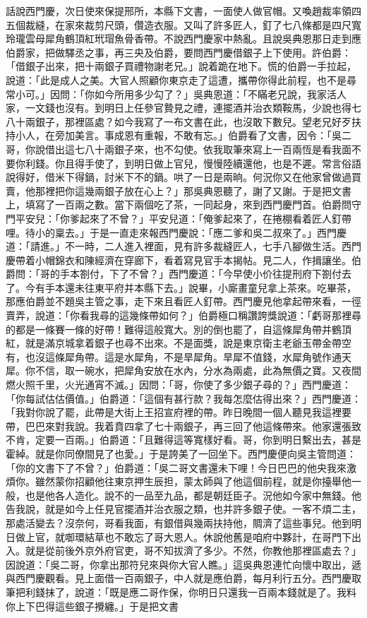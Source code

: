 \begin{showcontents}{}
話說西門慶，次日使來保提邢所，本縣下文書，一面使人做官帽。又喚趙裁率領四五個裁縫，在家來裁剪尺頭，儹造衣服。又叫了許多匠人，釘了七八條都是四尺寬玲瓏雲母犀角鶴頂紅玳瑁魚骨香帶。不說西門慶家中熱亂。且說吳典恩那日走到應伯爵家，把做驛丞之事，再三央及伯爵，要問西門慶借銀子上下使用。許伯爵：「借銀子出來，把十兩銀子買禮物謝老兄。」說着跪在地下。慌的伯爵一手拉起，說道：「此是成人之美。大官人照顧你東京走了這遭，攜帶你得此前程，也不是尋常小可。」因問：「你如今所用多少勾了？」吳典恩道：「不瞞老兄說，我家活人家，一文錢也沒有。到明日上任參官贄見之禮，連擺酒并治衣類鞍馬，少說也得七八十兩銀子，那裡區處？如今我寫了一布文書在此，也沒敢下數兒。望老兄好歹扶持小人，在旁加美言。事成恩有重報，不敢有忘。」伯爵看了文書，因令：「吳二哥，你說借出這七八十兩銀子來，也不勾使。依我取筆來寫上一百兩恆是看我面不要你利錢。你且得手使了，到明日做上官兒，慢慢陸續還他，也是不遲。常言俗語說得好，借米下得鍋，討米下不的鍋。哄了一日是兩晌。何況你又在他家曾做過買賣，他那裡把你這幾兩銀子放在心上？」那吳典恩聽了，謝了又謝。于是把文書上，填寫了一百兩之數。當下兩個吃了茶，一同起身，來到西門慶門首。伯爵問守門平安兒：「你爹起來了不曾？」平安兒道：「俺爹起來了，在捲棚看着匠人釘帶哩。待小的稟去。」于是一直走來報西門慶說：「應二爹和吳二叔來了。」西門慶道：「請進。」不一時，二人進入裡面，見有許多裁縫匠人，七手八腳做生活。西門慶帶着小帽錦衣和陳經濟在穿廊下，看着寫見官手本揭帖。見二人，作揖讓坐。伯爵問：「哥的手本劄付，下了不曾？」西門慶道：「今早使小价往提刑府下劄付去了。今有手本還未往東平府并本縣下去。」說畢，小廝畫童兒拿上茶來。吃畢茶，那應伯爵並不題吳主管之事，走下來且看匠人釘帶。西門慶見他拿起帶來看，一徑賣弄，說道：「你看我尋的這幾條帶如何？」伯爵極口稱讚誇獎說道：「虧哥那裡尋的都是一條賽一條的好帶！難得這般寬大。別的倒也罷了，自這條犀角帶并鶴頂紅，就是滿京城拿着銀子也尋不出來。不是面獎，說是東京衛主老爺玉帶金帶空有，也沒這條犀角帶。這是水犀角，不是旱犀角。旱犀不值錢，水犀角號作通天犀。你不信，取一碗水，把犀角安放在水內，分水為兩處，此為無價之寶。又夜間燃火照千里，火光通宵不滅。」因問：「哥，你使了多少銀子尋的？」西門慶道：「你每試估估價值。」伯爵道：「這個有甚行款？我每怎麼估得出來？」西門慶道：「我對你說了罷，此帶是大街上王招宣府裡的帶。昨日晚間一個人聽見我這裡要帶，巴巴來對我說。我着賁四拿了七十兩銀子，再三回了他這條帶來。他家還張致不肯，定要一百兩。」伯爵道：「且難得這等寬樣好看。哥，你到明日繫出去，甚是霍綽。就是你同僚間見了也愛。」于是誇美了一回坐下。西門慶便向吳主管問道：「你的文書下了不曾？」伯爵道：「吳二哥文書還未下哩！今日巴巴的他央我來激煩你。雖然蒙你招顧他往東京押生辰担，蒙太師與了他這個前程，就是你擡舉他一般，也是他各人造化。說不的一品至九品，都是朝廷臣子。況他如今家中無錢。他告我說，就是如今上任見官擺酒并治衣服之類，也并許多銀子使。一客不煩二主，那處活變去？沒奈何，哥看我面，有銀借與幾兩扶持他，賙濟了這些事兒。他到明日做上官，就啣環結草也不敢忘了哥大恩人。休說他舊是咱府中夥計，在哥門下出入。就是從前後外京外府官吏，哥不知拔濟了多少。不然，你教他那裡區處去？」因說道：「吳二哥，你拿出那符兒來與你大官人瞧。」這吳典恩連忙向懷中取出，遞與西門慶觀看。見上面借一百兩銀子，中人就是應伯爵，每月利行五分。西門慶取筆把利錢抹了，說道：「既是應二哥作保，你明日只還我一百兩本錢就是了。我料你上下巴得這些銀子攪纏。」于是把文書
\end{showcontents}
